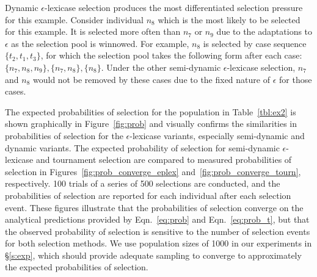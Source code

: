 \documentclass[twoside]{article}
\begin{document}
Dynamic $\epsilon$-lexicase selection produces the most differentiated selection pressure for this example. Consider individual $n_8$ which is the most likely to be selected for this example. It is selected more often than $n_7$ or $n_9$ due to the adaptations to $\epsilon$ as the selection pool is winnowed. For example, $n_8$ is selected by case sequence $\{t_2,t_1,t_3\}$, for which the selection pool takes the following form after each case: $\{n_7, n_8, n_9\}, \{n_7, n_8\}, \{n_8\}$. Under the other semi-dynamic $\epsilon$-lexicase selection, $n_7$ and $n_8$ would not be removed by these cases due to the fixed nature of $\epsilon$ for those cases. 

The expected probabilities of selection for the population in Table~\ref{tbl:ex2} is shown graphically in Figure~\ref{fig:prob} and visually confirms the similarities in probabilities of selection for the $\epsilon$-lexicase variants, especially semi-dynamic and dynamic variants. The expected probability of selection for semi-dynamic $\epsilon$-lexicase and tournament selection are compared to measured probabilities of selection in Figures~\ref{fig:prob_converge_eplex} and~\ref{fig:prob_converge_tourn}, respectively. 100 trials of a series of 500 selections are conducted, and the probabilities of selection are reported for each individual after each selection event. These figures illustrate that the probabilities of selection converge on the analytical predictions provided by Eqn.~\ref{eq:prob} and Eqn.~\ref{eq:prob_t}, but that the observed probability of selection is sensitive to the number of selection events for both selection methods. We use population sizes of 1000 in our experiments in \S\ref{s:exp}, which should provide adequate sampling to converge to approximately the expected probabilities of selection. 
\end{document}
